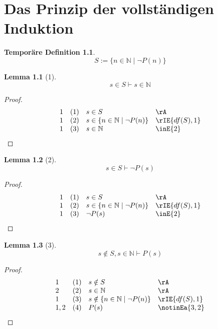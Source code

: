 \documentclass{book}
\theoremstyle{plain}
\newtheorem*{lemma}{Lemma} %
\theoremstyle{remark}
\theoremstyle{definition}
\newtheorem*{tempdefinition}{Temporäre Definition}
\begin{document}
\chapter{Das Prinzip der vollständigen Induktion}

\begin{tempdefinition}
    \[S:=\{n\in\mathbb{N} \mid \neg P(n)\}\]
\end{tempdefinition}

\label{PLpZeroRpwFanInNaturalLpPLpnRpToPLpnPlusOneRpRpImpFanInNaturalPLpnRpLo}
\begin{lemma}[1]
\[s\in S\vdash s\in\mathbb{N}\]
\end{lemma}
\begin{proof}
	\[
	\begin{array}{llll}
		1 &  (1) & s\in S & \rA \\
		1 &  (2) & s\in \{n\in\mathbb{N} \mid \neg P(n)\} & \rIE{df(S),1} \\	
		1 &  (3) & s\in\mathbb{N} & \inE{2} \\	
	\end{array}
	\]
\end{proof}

\label{PLpZeroRpwFanInNaturalLpPLpnRpToPLpnPlusOneRpRpImpFanInNaturalPLpnRpLoo}
\begin{lemma}[2]
\[s\in S\vdash \neg P(s)\]
\end{lemma}
\begin{proof}
	\[
	\begin{array}{llll}
		1 &  (1) & s\in S & \rA \\
		1 &  (2) & s\in \{n\in\mathbb{N} \mid \neg P(n)\} & \rIE{df(S),1} \\	
		1 &  (3) & \neg P(s) & \inE{2} \\	
	\end{array}
	\]
\end{proof}

\label{PLpZeroRpwFanInNaturalLpPLpnRpToPLpnPlusOneRpRpImpFanInNaturalPLpnRpLooo}
\begin{lemma}[3]
\[s\notin S, s\in \mathbb{N}\vdash P(s)\]
\end{lemma}
\begin{proof}
	\[
	\begin{array}{llll}
		1 &  (1) & s\notin S & \rA \\
            2 &  (2) & s\in \mathbb{N} & \rA \\
            1 &  (3) & s\notin \{n\in\mathbb{N} \mid \neg P(n)\} & \rIE{df(S), 1} \\
		1,2 &  (4) & P(s) & \notinEa{3,2} \\	
	\end{array}
	\]
\end{proof}
\end{document}
